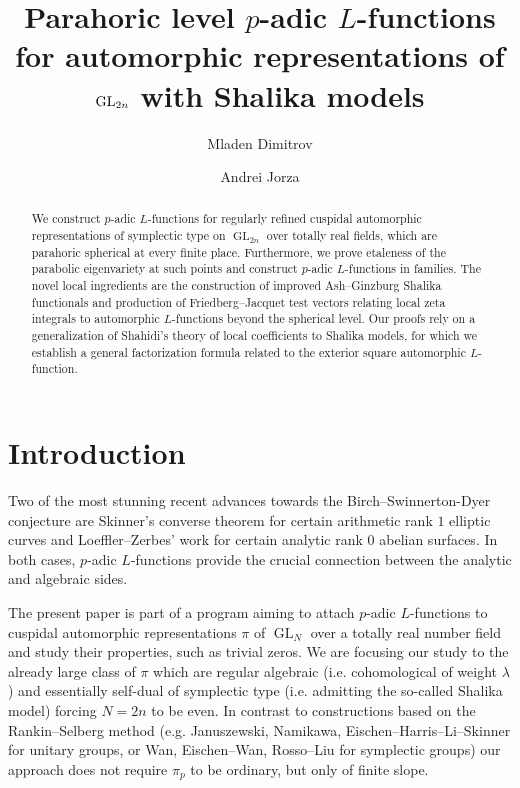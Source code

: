 \documentclass{amsart}
\title{Parahoric level $p$-adic $L$-functions for automorphic representations of $\GL_{2n}$ with Shalika models}
\author{Mladen Dimitrov \and Andrei Jorza}
\date{}
\theoremstyle{definition}
\newcommand{\GL}{\operatorname{GL}}
\begin{document}
\maketitle

\begin{abstract}
We construct $p$-adic $L$-functions for regularly refined cuspidal automorphic representations  of symplectic type on $\GL_{2n}$ over totally real fields,
which are parahoric spherical at every finite place. Furthermore, we prove etaleness of the parabolic eigenvariety at such points and
construct  $p$-adic $L$-functions in families. The novel local ingredients are the construction of improved Ash--Ginzburg Shalika functionals
and production of Friedberg--Jacquet test vectors relating local zeta integrals to automorphic $L$-functions beyond the spherical level. 
Our proofs rely on a generalization of Shahidi's theory of local coefficients to Shalika models, for which we establish a general factorization formula related to the exterior square automorphic $L$-function. 
\end{abstract}



\section*{Introduction}

Two of the most stunning recent advances towards the Birch--Swinnerton-Dyer conjecture are  Skinner's  converse theorem  \cite{skinner:bsd}  
for certain arithmetic rank $1$ elliptic curves and Loeffler--Zerbes' work \cite{loeffler-zerbes:bsd} for certain analytic rank $0$
 abelian surfaces. In both cases, $p$-adic $L$-functions provide the crucial connection between the analytic and algebraic sides.


The present paper is part of a program aiming  to attach $p$-adic $L$-functions to cuspidal automorphic representations $\pi$ of $\GL_N$ over a totally real number field and study their properties, such as trivial zeros. We are focusing our study to the already large class of $\pi$ which are regular algebraic (i.e. cohomological of weight $\lambda$) and essentially self-dual of symplectic type (i.e. admitting the so-called Shalika model) forcing $N=2n$ to be even.  In contrast to constructions based on the Rankin--Selberg method (e.g. Januszewski, Namikawa,  Eischen--Harris--Li--Skinner for unitary groups,  or Wan, Eischen--Wan, Rosso--Liu for symplectic groups) our approach  does not  require $\pi_p$ to be ordinary, but only  of finite slope. 
\end{document}
